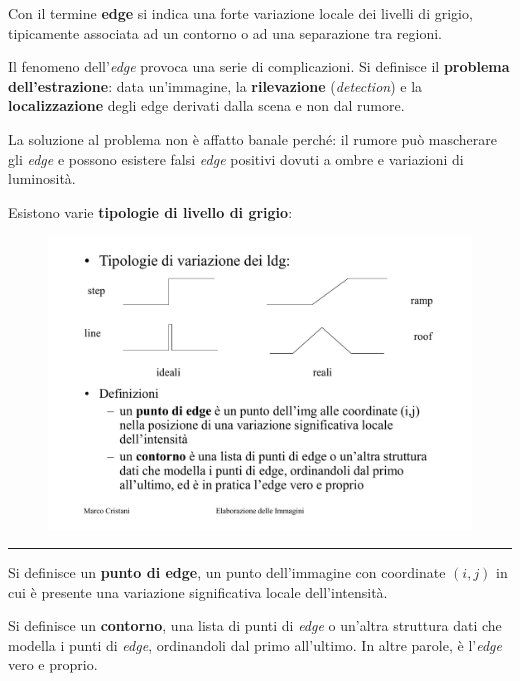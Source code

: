 \documentclass[a4paper]{article}
\newcommand{\longline}{\noindent\rule{\textwidth}{0.4pt}}
\begin{document}
	\noindent
	Con il termine \textcolor{Red3}{\textbf{edge}} si indica una forte variazione locale dei livelli di grigio, tipicamente associata ad un contorno o ad una separazione tra regioni.\newline
	
	\noindent
	Il fenomeno dell'\emph{edge} provoca una serie di complicazioni. Si definisce il \textcolor{Red3}{\textbf{problema dell'estrazione}}: data un'immagine, la \textbf{rilevazione} (\emph{detection}) e la \textbf{localizzazione} degli edge derivati dalla scena e non dal rumore.\newline
	
	\noindent
	La soluzione al problema non è affatto banale perché: il rumore può mascherare gli \emph{edge} e possono esistere falsi \emph{edge} positivi dovuti a ombre e variazioni di luminosità.\newline
	
	\noindent
	Esistono varie \textbf{tipologie di livello di grigio}:
	\begin{figure}[!htp]
		\centering
		\includegraphics[width=\textwidth]{img/tipologie_ldg.pdf}
	\end{figure}

	\longline\vspace{1em}
	
	\noindent
	Si definisce un \textcolor{Red3}{\textbf{punto di edge}}, un punto dell'immagine con coordinate $\left(i,j\right)$ in cui è presente una variazione significativa locale dell'intensità.\newline
	
	\noindent
	Si definisce un \textcolor{Red3}{\textbf{contorno}}, una lista di punti di \emph{edge} o un'altra struttura dati che modella i punti di \emph{edge}, ordinandoli dal primo all'ultimo. In altre parole, è l'\emph{edge} vero e proprio.\newline
	
\end{document}
